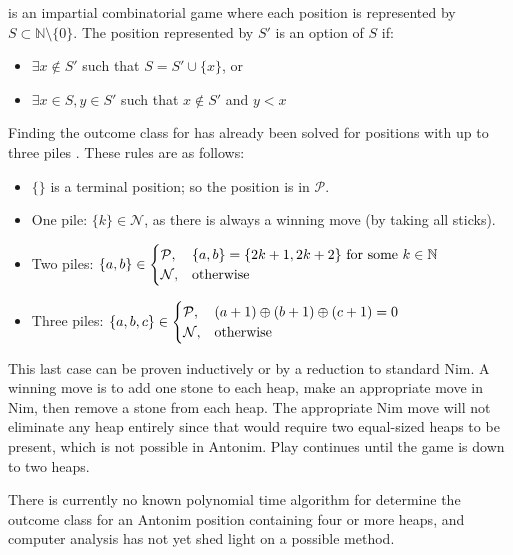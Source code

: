\documentclass[letter,10pt]{article}
\begin{document}
\begin{definition}[Antonim]
	\label{def:antonim}
	 is an impartial combinatorial game where each position is represented by $S \subset \mathbb{N} \setminus \{0\}$.  The position represented by $S'$ is an option of $S$ if:
	\begin{itemize}
		\item $\exists x \notin S'$ such that $S = S' \cup \{x\}$, or
		\item $\exists x \in S, y \in S'$ such that $x \notin S'$ and $y < x$
	\end{itemize} 
\end{definition}

Finding the outcome class for   has already been solved for positions with up to three piles \cite{WinningWays:2001}.  These rules are as follows:

\begin{itemize}
    \item $\{\}$ is a terminal position; so the position is in $\mathcal{P}$.
    \item One pile: $\{k\} \in \mathcal{N}$, as there is always a winning move (by taking all sticks).
    \item Two piles: $\{a, b\} \in 
        \begin{cases}
            \mathcal{P}, & \{a, b\} = \{2k+1, 2k+2\} \mbox{ for some } k \in \mathbb{N} \cr
            \mathcal{N}, & \mbox{otherwise}
        \end{cases}$
    \item Three piles: $\{a, b, c\} \in
        \begin{cases}
            \mathcal{P}, & (a+1) \oplus (b+1) \oplus (c+1)=0 \cr
            \mathcal{N}, & \mbox{otherwise}
        \end{cases}$
\end{itemize}

This last case can be proven inductively or by a reduction to standard Nim. A winning move is to add one stone to each heap, make an appropriate move in Nim, then remove a stone from each heap. The appropriate Nim move will not eliminate any heap entirely since that would require two equal-sized heaps to be present, which is not possible in Antonim. Play continues until the game is down to two heaps.










There is currently no known polynomial time algorithm for determine the outcome class for an Antonim position containing four or more heaps, and computer analysis has not yet shed light on a possible method.
\end{document}
